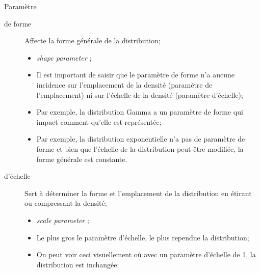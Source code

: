 \documentclass[10pt, french]{article}
\begin{document}
\begin{multicols*}{2}
Paramètre
\begin{description}
	\item[de forme]	Affecte la forme générale de la distribution;
		\begin{itemize}
		\item	\og \textit{shape parameter} \fg{};
		\item	Il est important de saisir que le paramètre de forme n'a aucune incidence sur l'emplacement de la densité (paramètre de l'emplacement) ni sur l'échelle de la densité (paramètre d'échelle);
		\item	Par exemple, la distribution Gamma a un paramètre de forme qui impact comment qu'elle est représentée;
		\item	Par exemple, la distribution exponentielle n'a pas de paramètre de forme et bien que l'échelle de la distribution peut être modifiée, la forme générale est constante.
		\end{itemize}
	\item[d'échelle]	Sert à déterminer la forme et l'emplacement de la distribution en étirant ou compressant la densité;
		\begin{itemize}
		\item	\og \textit{scale parameter} \fg{};
		\item	Le plus gros le paramètre d'échelle, le plus rependue la distribution;
		\item	On peut voir ceci visuellement où avec un paramètre d'échelle de 1, la distribution est inchangée:
		\end{itemize}
		\begin{center}

\begin{tikzpicture}[x=0.75pt,y=0.75pt,yscale=-1,xscale=1]


\end{tikzpicture}
\end{center}
\end{description}
\end{multicols*}
\end{document}
